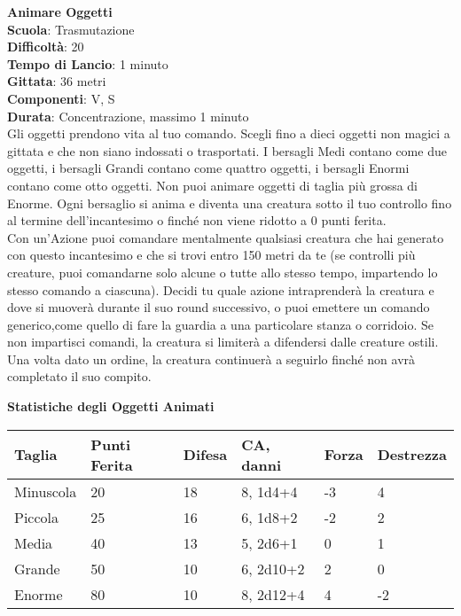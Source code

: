 \begin{multicols}{2}
\medskip\textbf{Animare Oggetti}\\
\textbf{Scuola}: Trasmutazione\\
\textbf{Difficoltà}:  20\\
\textbf{Tempo di Lancio}: 1 minuto\\
\textbf{Gittata}: 36 metri\\
\textbf{Componenti}: V, S\\
\textbf{Durata}: Concentrazione, massimo 1 minuto\\
Gli oggetti prendono vita al tuo comando. Scegli fino a dieci oggetti non magici a gittata e che non siano indossati o trasportati. I bersagli Medi contano come due oggetti, i bersagli Grandi contano come quattro oggetti, i bersagli Enormi contano come otto oggetti. Non puoi animare oggetti di taglia più grossa di Enorme. Ogni bersaglio si anima e diventa una creatura sotto il tuo controllo fino al termine dell'incantesimo o finché non viene ridotto a 0 punti ferita.\\
Con un'Azione puoi comandare mentalmente qualsiasi creatura che hai generato con questo incantesimo e che si trovi entro 150 metri da te (se controlli più creature, puoi comandarne solo alcune o tutte allo stesso tempo, impartendo lo stesso comando a ciascuna). Decidi tu quale azione intraprenderà la creatura e dove si muoverà durante il suo round successivo, o puoi emettere un comando generico,come quello di fare la guardia a una particolare stanza o corridoio. Se non impartisci comandi, la creatura si limiterà a difendersi dalle creature ostili. Una volta dato un ordine, la creatura continuerà a seguirlo finché non avrà completato il suo compito.
\bigskip

\end{multicols}

\textbf{Statistiche degli Oggetti Animati}
\bigskip

\begin{tabular}{llllll}
Taglia		&Punti Ferita	&Difesa	&CA, danni					&Forza	&Destrezza\\ 
\toprule
Minuscola 	&20 			&18		&8, {1d4+4} 	&-3 		&4\\
Piccola 	&25 			&16 	&6, {1d8+2} 	&-2 		&2\\
Media 		&40 			&13 	&5, {2d6+1} 	&0 			&1\\
Grande 		&50 			&10 	&6, {2d10+2}	&2 			&0\\
Enorme 		&80 			&10 	&8, {2d12+4}	&4 			&-2\\
\end{tabular}

